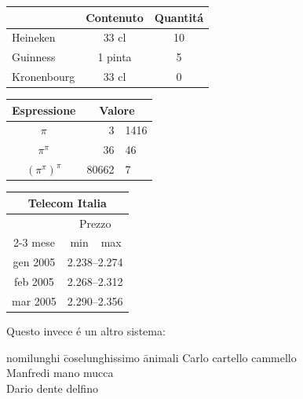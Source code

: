 \documentclass[12pt]{article}
\begin{document}
\bigskip\bigskip

\begin{tabular}{||p{5cm}||*{2}{c|}|}
\hline
& Contenuto & Quantit\'a \\
\hline
\hline
 Heineken & 33 cl & 10 \\
\hline
 Guinness & 1 pinta & 5 \\
\hline
 Kronenbourg & 33 cl & 0 \\
\hline
\end{tabular} 

\bigskip\bigskip

\begin{tabular}{c r @{,} l}
Espressione &
\multicolumn{2}{c}{Valore}\\
\hline
$\pi$ & 3&1416 \\
$\pi^{\pi}$ & 36&46 \\
$(\pi^{\pi})^{\pi}$ & 80662&7\\
\end{tabular}

\bigskip\bigskip

\begin{center}
\begin{tabular}{|c||r|c|}
\hline
\multicolumn{3}{|c|}{Telecom Italia}\\
\hline
\hline
&\multicolumn{2}{c|}{Prezzo}\\
\cline{2-3}
mese&min&max\\
\hline
gen 2005&\multicolumn{2}{c|}{2.238--2.274}\\
\hline
feb 2005&\multicolumn{2}{c|}{2.268--2.312}\\
\hline
mar 2005&\multicolumn{2}{c|}{2.290--2.356}\\
\hline
\end{tabular}
\end{center}

\bigskip\bigskip
Questo invece \'e un altro sistema:

\bigskip

\begin{tabbing}
  nomilunghi \= coselunghissimo \= animali \kill
Carlo \> cartello \> cammello \\
Manfredi \> mano \> mucca \\
  Dario \> dente \> delfino 
\end{tabbing}
\end{document}
